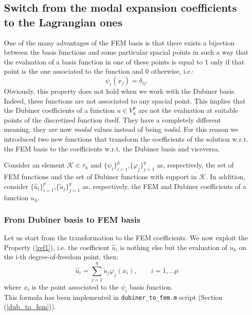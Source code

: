 \documentclass[a4paper,11pt]{article}
\begin{document}
\subsection{Switch from the modal expansion coefficients to the Lagrangian ones} \label{FEM_DUB_conversion}
One of the many advantages of the FEM basis is that there exists a bijection between the basis functions and some particular spacial points in such a way that the evaluation of a basis function in one of these points is equal to 1 only if that point is the one associated to the function and 0 otherwise, i.e.:
	\begin{equation} \label{ref1}
	\psi_i(x_j)=\delta_{ij}.
	\end{equation}
	Obviously, this property does not hold when we work with the Dubiner basis. Indeed, these functions are not associated to any spacial point. This implies that the Dubiner coefficients of a function $u\in V_h^p$ are not the evaluation at suitable points of the discretized function itself. They have a completely different meaning, they are now \emph{modal} values instead of being \emph{nodal}.
	For this reason we introduced two new functions that transform the coefficients of the solution w.r.t. the FEM basis to the coefficients w.r.t. the Dubiner basis and viceversa.\vspace{5mm}
	
	\noindent Consider an element $\mathcal{K}\in \tau_h$ and $\{\psi_{i}\}_{i=1}^{p}$,$\{\varphi_{j}\}_{j=1}^{q}$ as, respectively, the set of FEM functions and the set of Dubiner functions with support in $\mathcal{K}$. In addition, consider $\{\hat{u}_i\}_{i=1}^p$,$\{\tilde{u}_j\}_{j=1}^q$ as, respectively, the FEM and Dubiner coefficients of a function $u_h$.
	
	\subsubsection{From Dubiner basis to FEM basis}
	\noindent Let us start from the transformation to the FEM coefficients. We now exploit the Property (\ref{ref1}), i.e. the coefficient $\hat{u}_i$ is nothing else but the evaluation of $u_h$ on the i-th degree-of-freedom point, then: 
	\begin{equation} \label{ref3}
	\hat{u}_i = \sum_{j=1}^q \tilde{u}_j\varphi_j(x_i), \qquad i=1, \dots p
	\end{equation}
	where $x_i$ is the point associated to the $\psi_i$ basis function. \\
	This formula has been implemented in \texttt{dubiner\_to\_fem.m} script (Section (\ref{dub_to_fem})).
\end{document}
